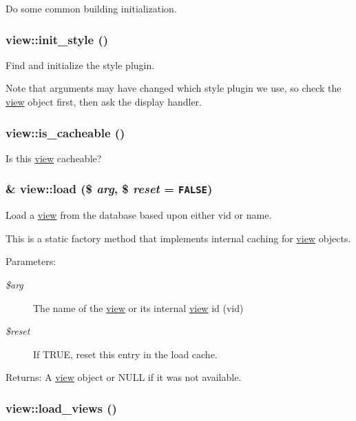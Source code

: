 Do some common building initialization. \hypertarget{classview_22ea4e41e69fadff64193a54a63a24e9}{
\subsubsection[{init\_\-style}]{\setlength{\rightskip}{0pt plus 5cm}view::init\_\-style ()}}
\label{classview_22ea4e41e69fadff64193a54a63a24e9}


Find and initialize the style plugin.

Note that arguments may have changed which style plugin we use, so check the \hyperlink{classview}{view} object first, then ask the display handler. \hypertarget{classview_ca962e114d7d15eb16dd3b3616e5a96d}{
\subsubsection[{is\_\-cacheable}]{\setlength{\rightskip}{0pt plus 5cm}view::is\_\-cacheable ()}}
\label{classview_ca962e114d7d15eb16dd3b3616e5a96d}


Is this \hyperlink{classview}{view} cacheable? \hypertarget{classview_ea9b1d4f59fb64b8007c2627ef0dc590}{
\subsubsection[{load}]{\setlength{\rightskip}{0pt plus 5cm}\& view::load (\$ {\em arg}, \/  \$ {\em reset} = {\tt FALSE})}}
\label{classview_ea9b1d4f59fb64b8007c2627ef0dc590}


Load a \hyperlink{classview}{view} from the database based upon either vid or name.

This is a static factory method that implements internal caching for \hyperlink{classview}{view} objects.

\begin{Desc}
\item[Parameters:]
\begin{description}
\item[{\em \$arg}]The name of the \hyperlink{classview}{view} or its internal \hyperlink{classview}{view} id (vid) \item[{\em \$reset}]If TRUE, reset this entry in the load cache. \end{description}
\end{Desc}
\begin{Desc}
\item[Returns:]A \hyperlink{classview}{view} object or NULL if it was not available. \end{Desc}
\hypertarget{classview_eddb81841a3933280dce642309b74840}{
\subsubsection[{load\_\-views}]{\setlength{\rightskip}{0pt plus 5cm}view::load\_\-views ()}}
\label{classview_eddb81841a3933280dce642309b74840}


